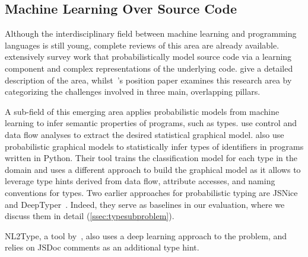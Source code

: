 \documentclass[acmsmall, review, anonymous]{acmart}\settopmatter{printfolios=true,printccs=false,printacmref=false}
\newcommand{\projectname}{\textsc{OptTyper}\xspace}
\begin{document}

\subsection{Machine Learning Over Source Code}
Although the interdisciplinary field between machine learning and programming
languages is still young, complete reviews of this area are
already available.
%
\citet{allamanis17} extensively survey
work that probabilistically model source code via
a learning component and complex representations of the underlying
code.
%
\citet{vechev16} give
a detailed description of the area, whilst~\citet{threepillars}'s
position paper examines this research area by categorizing
the challenges involved in three main, overlapping pillars.

A sub-field of this
emerging area applies probabilistic models from machine learning to infer semantic
properties of programs, such as types.
%
\citet{chibotaru19} use control and data flow analyses to extract
the desired statistical graphical model.
%
\citet{xu16} also use probabilistic graphical models to statistically infer
types of identifiers in programs written in Python. Their tool trains the
classification model for each type in the domain and uses a different
approach to build the graphical model as it allows to leverage type hints
derived from data flow, attribute accesses, and naming conventions for types.
%
Two earlier approaches for probabilistic typing are JSNice~\citep{raychev15} and
DeepTyper~\citep{hellendoorn18}.
Indeed, they serve as baselines in our evaluation, where we discuss them in
detail (\autoref{ssec:typesubproblem}).

NL2Type, a tool by~\cite{malik19}, also uses
a deep learning approach to the problem, and  relies on JSDoc comments as
an additional type hint.
%

\end{document}
